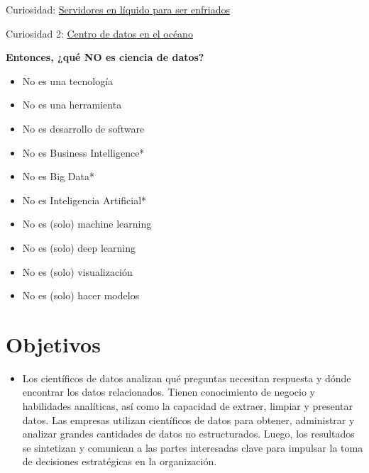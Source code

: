 \documentclass[
]{book}
\providecommand{\tightlist}{%
  \setlength{\itemsep}{0pt}\setlength{\parskip}{0pt}}
\begin{document}
Curiosidad: \href{https://www.xatakawindows.com/actualidad-en-redmond/servidores-liquido-hirviendo-esta-idea-microsoft-para-evitar-calentamiento-sus-equipos\#:~:text=Con\%20este\%20sistema\%2C\%20el\%20dispositivo,fr\%C3\%ADo\%2C\%20emplea\%20uno\%20en\%20ebullici\%C3\%B3n.}{Servidores en líquido para ser enfriados}

Curiosidad 2: \href{https://www.bbc.com/mundo/noticias/2016/02/160202_microsoft_centro_datos_debajo_agua_mar_subamino_all}{Centro de datos en el océano}

\textbf{Entonces, ¿qué NO es ciencia de datos?}

\begin{itemize}
\tightlist
\item
  No es una tecnología
\item
  No es una herramienta
\item
  No es desarrollo de software
\item
  No es Business Intelligence*
\item
  No es Big Data*
\item
  No es Inteligencia Artificial*
\item
  No es (solo) machine learning
\item
  No es (solo) deep learning
\item
  No es (solo) visualización
\item
  No es (solo) hacer modelos
\end{itemize}

\hypertarget{objetivos}{%
\section{Objetivos}\label{objetivos}}

\begin{itemize}
\tightlist
\item
  Los científicos de datos analizan qué preguntas necesitan respuesta y dónde encontrar los datos relacionados. Tienen conocimiento de negocio y habilidades analíticas, así como la capacidad de extraer, limpiar y presentar datos. Las empresas utilizan científicos de datos para obtener, administrar y analizar grandes cantidades de datos no estructurados. Luego, los resultados se sintetizan y comunican a las partes interesadas clave para impulsar la toma de decisiones estratégicas en la organización.
\end{itemize}
\end{document}
